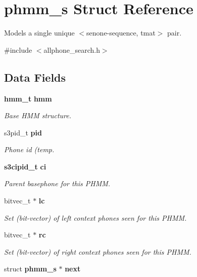 \section{phmm\-\_\-s Struct Reference}
\label{structphmm__s}


Models a single unique $<$senone-\/sequence, tmat$>$ pair.  




{\ttfamily \#include $<$allphone\-\_\-search.\-h$>$}

\subsection*{Data Fields}
\begin{DoxyCompactItemize}
\item 
{\bf hmm\-\_\-t} {\bf hmm}\label{structphmm__s_a829311265f8df700c9fb628f5bdff0ad}

\begin{DoxyCompactList}\small\item\em Base H\-M\-M structure. \end{DoxyCompactList}\item 
s3pid\-\_\-t {\bf pid}
\begin{DoxyCompactList}\small\item\em Phone id (temp. \end{DoxyCompactList}\item 
{\bf s3cipid\-\_\-t} {\bf ci}\label{structphmm__s_afe385b65ca02fb4e3a087a0997ea4eac}

\begin{DoxyCompactList}\small\item\em Parent basephone for this P\-H\-M\-M. \end{DoxyCompactList}\item 
bitvec\-\_\-t $\ast$ {\bf lc}\label{structphmm__s_aad9f810256dea9ee491d21eb3a349d1c}

\begin{DoxyCompactList}\small\item\em Set (bit-\/vector) of left context phones seen for this P\-H\-M\-M. \end{DoxyCompactList}\item 
bitvec\-\_\-t $\ast$ {\bf rc}\label{structphmm__s_a94ead49959a95398643178d8dc1609f8}

\begin{DoxyCompactList}\small\item\em Set (bit-\/vector) of right context phones seen for this P\-H\-M\-M. \end{DoxyCompactList}\item 
struct {\bf phmm\-\_\-s} $\ast$ {\bf next}\label{structphmm__s_a62c94d334abbbd2431d5e7e0ace79a14}


\end{DoxyCompactItemize}
